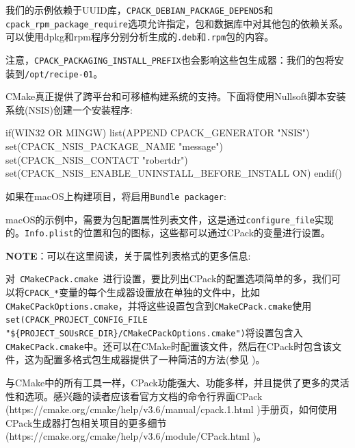 我们的示例依赖于UUID库，\texttt{CPACK\_DEBIAN\_PACKAGE\_DEPENDS}和\texttt{cpack\_rpm\_package\_require}选项允许指定，包和数据库中对其他包的依赖关系。可以使用dpkg和rpm程序分别分析生成的\texttt{.deb}和\texttt{.rpm}包的内容。

注意，\texttt{CPACK\_PACKAGING\_INSTALL\_PREFIX}也会影响这些包生成器：我们的包将安装到\texttt{/opt/recipe-01}。

CMake真正提供了跨平台和可移植构建系统的支持。下面将使用Nullsoft脚本安装系统(NSIS)创建一个安装程序:

\begin{codebox}[cmake]
if(WIN32 OR MINGW)
  list(APPEND CPACK_GENERATOR "NSIS")
  set(CPACK_NSIS_PACKAGE_NAME "message")
  set(CPACK_NSIS_CONTACT "robertdr")
  set(CPACK_NSIS_ENABLE_UNINSTALL_BEFORE_INSTALL ON)
endif()
\end{codebox}

如果在macOS上构建项目，将启用\texttt{Bundle packager}:


macOS的示例中，需要为包配置属性列表文件，这是通过\texttt{configure\_file}实现的。\texttt{Info.plist}的位置和包的图标，这些都可以通过CPack的变量进行设置。

\begin{myInfoBox}
\textbf{NOTE}：可以在这里阅读，关于属性列表格式的更多信息:
\end{myInfoBox}


对\texttt{ CMakeCPack.cmake }进行设置，要比列出CPack的配置选项简单的多，我们可以将\texttt{CPACK\_*}变量的每个生成器设置放在单独的文件中，比如\texttt{CMakeCPackOptions.cmake}，并将这些设置包含到\texttt{CMakeCPack.cmake}使用\texttt{set(CPACK\_PROJECT\_CONFIG\_FILE "\$\{PROJECT\_SOUsRCE\_DIR\}/CMakeCPackOptions.cmake")}将设置包含入\texttt{ CMakeCPack.cmake}中。还可以在CMake时配置该文件，然后在CPack时包含该文件，这为配置多格式包生成器提供了一种简洁的方法(参见 )。

与CMake中的所有工具一样，CPack功能强大、功能多样，并且提供了更多的灵活性和选项。感兴趣的读者应该看官方文档的命令行界面CPack (https://cmake.org/cmake/help/v3.6/manual/cpack.1.html )手册页，如何使用CPack生成器打包相关项目的更多细节(https://cmake.org/cmake/help/v3.6/module/CPack.html )。


